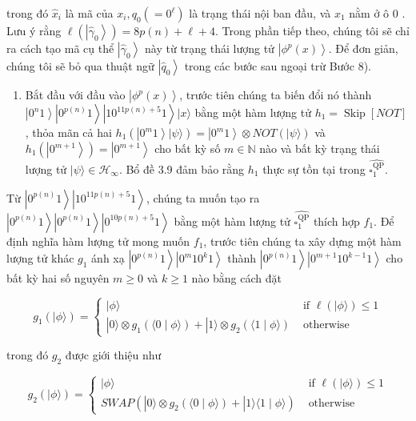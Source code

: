 \documentclass[10pt]{article}
\begin{document}
trong đó $\hat{x}_{i}$ là mã của $x_{i}, q_{0}\left(=0^{\ell}\right)$ là trạng thái nội ban đầu, và $x_{1}$ nằm ở ô 0 . Lưu ý rằng $\ell\left(\left|\hat{\gamma}_{0}\right\rangle\right)= 8 p(n)+\ell+4$. Trong phần tiếp theo, chúng tôi sẽ chỉ ra cách tạo mã cụ thể $\left|\hat{\gamma}_{0}\right\rangle$ này từ trạng thái lượng tử $\left|\phi^{p}(x)\right\rangle$. Để đơn giản, chúng tôi sẽ bỏ qua thuật ngữ $\left|\hat{q}_{0}\right\rangle$ trong các bước sau ngoại trừ Bước 8).

\begin{enumerate}
  \item Bắt đầu với đầu vào $\left|\phi^{p}(x)\right\rangle$, trước tiên chúng ta biến đổi nó thành $\left|0^{n} 1\right\rangle\left|0^{p(n)} 1\right\rangle\left|10^{11 p(n)+5} 1\right\rangle|x\rangle$ bằng một hàm lượng tử $h_{1}=\operatorname{Skip}[N O T]$, thỏa mãn cả hai $h_{1}\left(\left|0^{m} 1\right\rangle|\psi\rangle\right)=\left|0^{m} 1\right\rangle \otimes N O T(|\psi\rangle)$ và $h_{1}\left(\left|0^{m+1}\right\rangle\right)=\left|0^{m+1}\right\rangle$ cho bất kỳ số $m \in \mathbb{N}$ nào và bất kỳ trạng thái lượng tử $|\psi\rangle \in \mathcal{H}_{\infty}$. Bổ đề 3.9 đảm bảo rằng $h_{1}$ thực sự tồn tại trong $\widehat{\square_{1}^{\mathrm{QP}}}$.
\end{enumerate}

Từ $\left|0^{p(n)} 1\right\rangle\left|10^{11 p(n)+5} 1\right\rangle$, chúng ta muốn tạo ra $\left|0^{p(n)} 1\right\rangle\left|0^{p(n)} 1\right\rangle\left|0^{10 p(n)+5} 1\right\rangle$ bằng một hàm lượng tử $\widehat{\square_{1}^{\mathrm{QP}}}$ thích hợp $f_{1}$. Để định nghĩa hàm lượng tử mong muốn $f_{1}$, trước tiên chúng ta xây dựng một hàm lượng tử khác $g_{1}$ ánh xạ $\left|0^{p(n)} 1\right\rangle\left|0^{m} 10^{k} 1\right\rangle$ thành $\left|0^{p(n)} 1\right\rangle\left|0^{m+1} 10^{k-1} 1\right\rangle$ cho bất kỳ hai số nguyên $m \geq 0$ và $k \geq 1$ nào bằng cách đặt

$$
g_{1}(|\phi\rangle)= \begin{cases}|\phi\rangle & \text { if } \ell(|\phi\rangle) \leq 1 \\ |0\rangle \otimes g_{1}(\langle 0 \mid \phi\rangle)+|1\rangle \otimes g_{2}(\langle 1 \mid \phi\rangle) & \text { otherwise }\end{cases}
$$

trong đó $g_{2}$ được giới thiệu như

$$
g_{2}(|\phi\rangle)= \begin{cases}|\phi\rangle & \text { if } \ell(|\phi\rangle) \leq 1 \\ S W A P\left(|0\rangle \otimes g_{2}(\langle 0 \mid \phi\rangle)+|1\rangle\langle 1 \mid \phi\rangle\right) & \text { otherwise }\end{cases}
$$
\end{document}
